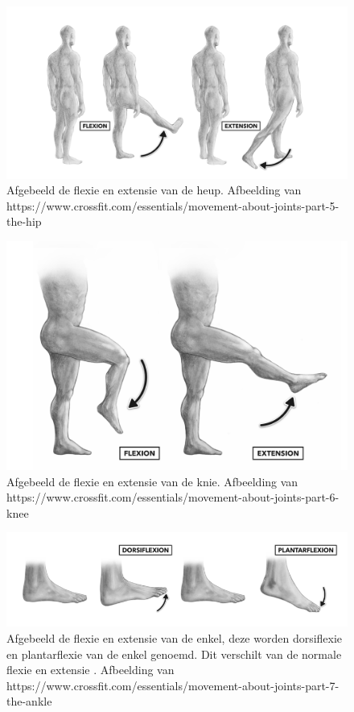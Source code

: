 \documentclass{article}
\begin{document}
\begin{figure}[h]
    \centering
    \includegraphics[width=\textwidth]{figures/hip.png}
    \caption{Afgebeeld de flexie en extensie van de heup. Afbeelding van https://www.crossfit.com/essentials/movement-about-joints-part-5-the-hip}
    \label{fig:hip}
\end{figure}

\begin{figure}[h]
    \centering
    \includegraphics[width=\textwidth]{figures/knee.png}
    \caption{Afgebeeld de flexie en extensie van de knie. Afbeelding van https://www.crossfit.com/essentials/movement-about-joints-part-6-knee}
    \label{fig:knee}
\end{figure}

\begin{figure}[h]
    \centering
    \includegraphics[width=\textwidth]{figures/ankle.png}
    \caption{Afgebeeld de flexie en extensie van de enkel, deze worden dorsiflexie en plantarflexie van de enkel genoemd. Dit verschilt van de normale flexie en extensie . Afbeelding van https://www.crossfit.com/essentials/movement-about-joints-part-7-the-ankle}
    \label{fig:ankle}
\end{figure}
\end{document}
